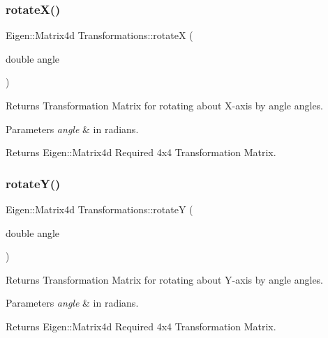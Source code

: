 \subsubsection{\texorpdfstring{rotate\+X()}{rotateX()}}
{\footnotesize\ttfamily Eigen\+::\+Matrix4d Transformations\+::rotateX (\begin{DoxyParamCaption}\item[{double}]{angle }\end{DoxyParamCaption})}



Returns Transformation Matrix for rotating about X-\/axis by \textquotesingle{}angle\textquotesingle{} angles. 


\begin{DoxyParams}{Parameters}
{\em angle} & in radians. \\
\hline
\end{DoxyParams}
\begin{DoxyReturn}{Returns}
Eigen\+::\+Matrix4d Required 4x4 Transformation Matrix. 
\end{DoxyReturn}
\mbox{\label{classTransformations_aa4a1b79a607ba97fa839c7f247ebc4df}} 
\subsubsection{\texorpdfstring{rotate\+Y()}{rotateY()}}
{\footnotesize\ttfamily Eigen\+::\+Matrix4d Transformations\+::rotateY (\begin{DoxyParamCaption}\item[{double}]{angle }\end{DoxyParamCaption})}



Returns Transformation Matrix for rotating about Y-\/axis by \textquotesingle{}angle\textquotesingle{} angles. 


\begin{DoxyParams}{Parameters}
{\em angle} & in radians. \\
\hline
\end{DoxyParams}
\begin{DoxyReturn}{Returns}
Eigen\+::\+Matrix4d Required 4x4 Transformation Matrix. 
\end{DoxyReturn}
\mbox{\label{classTransformations_af700b3a14795f2483e73dac667138907}} 
